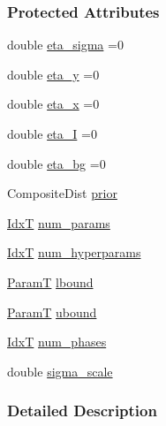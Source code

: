 \subsubsection*{Protected Attributes}
\begin{DoxyCompactItemize}
\item 
double \hyperlink{classmappel_1_1MCMCAdaptor2Ds_ae5305087fd5abee9b38324be42d57a70}{eta\+\_\+sigma} =0
\item 
double \hyperlink{classmappel_1_1MCMCAdaptor2D_a8e49652147538fe2a12943522f1a8b30}{eta\+\_\+y} =0
\item 
double \hyperlink{classmappel_1_1MCMCAdaptor1D_ae5787e38c9cef6168acf6fc5d3216693}{eta\+\_\+x} =0
\item 
double \hyperlink{classmappel_1_1MCMCAdaptor1D_a5780d326be0c40e10d6c91777cfffbd3}{eta\+\_\+I} =0
\item 
double \hyperlink{classmappel_1_1MCMCAdaptor1D_af54c93421b8e298289cbb92743c6b3d5}{eta\+\_\+bg} =0
\item 
Composite\+Dist \hyperlink{classmappel_1_1PointEmitterModel_a393839f8eb1dd3d61c9369377742ba0e}{prior}
\item 
\hyperlink{namespacemappel_ab17ec0f30b61ece292439d7ece81d3a8}{IdxT} \hyperlink{classmappel_1_1PointEmitterModel_a9af0484391bd6021ddc04ac666ab49ad}{num\+\_\+params}
\item 
\hyperlink{namespacemappel_ab17ec0f30b61ece292439d7ece81d3a8}{IdxT} \hyperlink{classmappel_1_1PointEmitterModel_ab2423214fdd81c8212118770b5b17b1f}{num\+\_\+hyperparams}
\item 
\hyperlink{classmappel_1_1PointEmitterModel_a665ec6aea3aac139bb69a23c06d4b9a1}{ParamT} \hyperlink{classmappel_1_1PointEmitterModel_a889bc82f74cfa654da121e5770296ab2}{lbound}
\item 
\hyperlink{classmappel_1_1PointEmitterModel_a665ec6aea3aac139bb69a23c06d4b9a1}{ParamT} \hyperlink{classmappel_1_1PointEmitterModel_a35b883e84b6a2e0093bdf482c623beef}{ubound}
\item 
\hyperlink{namespacemappel_ab17ec0f30b61ece292439d7ece81d3a8}{IdxT} \hyperlink{classmappel_1_1MCMCAdaptorBase_a44b90a984ace712584074dc17831fe25}{num\+\_\+phases}
\item 
double \hyperlink{classmappel_1_1MCMCAdaptorBase_a76312f7d589bf3f3e754beca174b884b}{sigma\+\_\+scale}
\end{DoxyCompactItemize}


\subsubsection{Detailed Description}


